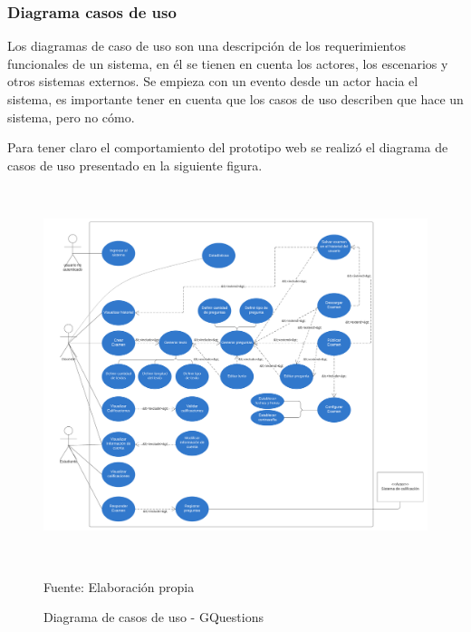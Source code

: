 \documentclass[../Main.tex]{subfiles}
\begin{document}
    \subsubsection{Diagrama casos de uso}
    \begin{justify}
    Los diagramas de caso de uso son una descripción de los requerimientos funcionales de un sistema, en él se tienen en cuenta los actores, los escenarios y otros sistemas externos.
    Se empieza con un evento desde un actor hacia el sistema, es importante tener en cuenta que los casos de uso describen que hace un sistema, pero no cómo.
    
    Para tener claro el comportamiento del prototipo web se realizó el diagrama de casos de uso presentado en la siguiente figura.
    
    \end{justify}
        \begin{figure}[H]
	\begin{Center}
		\includegraphics[width=6.4in,height=4.3in]{Images/Diagrama_casos_uso_GQuestions.png}
	    \caption{Diagrama de casos de uso - GQuestions}
	    Fuente: Elaboración propia
        \label{fig:section}
	\end{Center}
    \end{figure}

    \newpage
\end{document}
